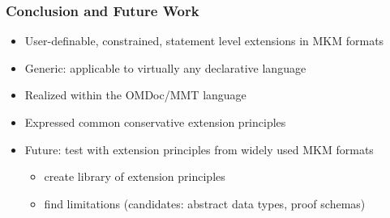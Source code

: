 \begin{frame}
\frametitle{Conclusion and Future Work}
\begin{itemize}
\item User-definable, constrained, statement level extensions in MKM formats
\item Generic: applicable to virtually any declarative language
\item Realized within the OMDoc/MMT language
\item Expressed common conservative extension principles 
\item Future: test with extension principles from widely used MKM formats %
\begin{itemize}
\item create library of extension principles
\item find limitations (candidates: abstract data types, proof schemas)
\end{itemize}
\end{itemize}
\end{frame}
